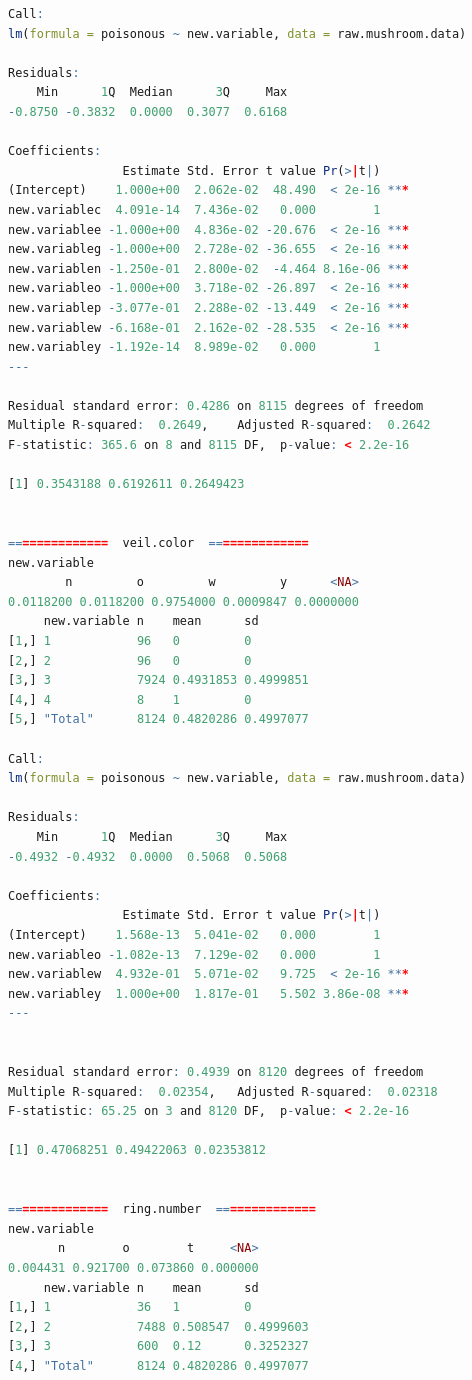 \documentclass[12pt]{article}
\begin{document}
\begin{lstlisting}[language = R]
Call:
lm(formula = poisonous ~ new.variable, data = raw.mushroom.data)

Residuals:
    Min      1Q  Median      3Q     Max 
-0.8750 -0.3832  0.0000  0.3077  0.6168 

Coefficients:
                Estimate Std. Error t value Pr(>|t|)    
(Intercept)    1.000e+00  2.062e-02  48.490  < 2e-16 ***
new.variablec  4.091e-14  7.436e-02   0.000        1    
new.variablee -1.000e+00  4.836e-02 -20.676  < 2e-16 ***
new.variableg -1.000e+00  2.728e-02 -36.655  < 2e-16 ***
new.variablen -1.250e-01  2.800e-02  -4.464 8.16e-06 ***
new.variableo -1.000e+00  3.718e-02 -26.897  < 2e-16 ***
new.variablep -3.077e-01  2.288e-02 -13.449  < 2e-16 ***
new.variablew -6.168e-01  2.162e-02 -28.535  < 2e-16 ***
new.variabley -1.192e-14  8.989e-02   0.000        1    
---

Residual standard error: 0.4286 on 8115 degrees of freedom
Multiple R-squared:  0.2649,	Adjusted R-squared:  0.2642 
F-statistic: 365.6 on 8 and 8115 DF,  p-value: < 2.2e-16

[1] 0.3543188 0.6192611 0.2649423


==============  veil.color  ==============
new.variable
        n         o         w         y      <NA> 
0.0118200 0.0118200 0.9754000 0.0009847 0.0000000 
     new.variable n    mean      sd       
[1,] 1            96   0         0        
[2,] 2            96   0         0        
[3,] 3            7924 0.4931853 0.4999851
[4,] 4            8    1         0        
[5,] "Total"      8124 0.4820286 0.4997077

Call:
lm(formula = poisonous ~ new.variable, data = raw.mushroom.data)

Residuals:
    Min      1Q  Median      3Q     Max 
-0.4932 -0.4932  0.0000  0.5068  0.5068 

Coefficients:
                Estimate Std. Error t value Pr(>|t|)    
(Intercept)    1.568e-13  5.041e-02   0.000        1    
new.variableo -1.082e-13  7.129e-02   0.000        1    
new.variablew  4.932e-01  5.071e-02   9.725  < 2e-16 ***
new.variabley  1.000e+00  1.817e-01   5.502 3.86e-08 ***
---


Residual standard error: 0.4939 on 8120 degrees of freedom
Multiple R-squared:  0.02354,	Adjusted R-squared:  0.02318 
F-statistic: 65.25 on 3 and 8120 DF,  p-value: < 2.2e-16

[1] 0.47068251 0.49422063 0.02353812


==============  ring.number  ==============
new.variable
       n        o        t     <NA> 
0.004431 0.921700 0.073860 0.000000 
     new.variable n    mean      sd       
[1,] 1            36   1         0        
[2,] 2            7488 0.508547  0.4999603
[3,] 3            600  0.12      0.3252327
[4,] "Total"      8124 0.4820286 0.4997077


\end{lstlisting}
\end{document}
